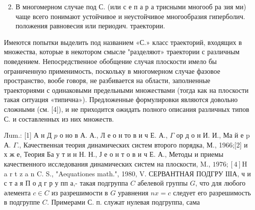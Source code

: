 \documentclass[10pt]{article}
\begin{document}
\begin{enumerate}

  \setcounter{enumi}{1}

  \item В многомерном случае под С. (или с е п а р а трисными многооб ра зия ми) чаще всего понимают устойчивое и неустойчивое многообразия гиперболич. положения равновесия или периодич. траектории.

\end{enumerate}



Имеются попытки выделить под названием «С.» класс траекторий, входящих в множества, которые в некотором смысле "разделяют» траектории с различным поведением. Непосредственное обобщение случая плоскости имело бы ограниченную применимость, поскольку в многомерном случае фазовое пространство, вообе говоря, не разбивается на области, заполненные траекториями с одинаковыми предельными множествами (тогда как на плоскости такая ситуация «типична»). Предложенные формулировки являются довольно сложными (см. [4]), и не приходится ожидать полного описания различных типов С. и составленных из них множеств.



Лum.: [1] А н Д $p$ о но в А. А., Л е о н то в и ч Е. А., $\Gamma$ ор д о н И. И., Ма й е $\mathrm{p}$ А. $\Gamma$., Качественная теория динамических систем второго порядка, М., 1966;[2] и х ж е, Теория Ба у т и н Н. Н., Ј е о н т о в и ч Е. А., Методы и приемы качественного исследования динамических систем на плоскости, M., $1976 ;[4] \mathrm{H}$ a r t $\mathrm{z}$ a n C. S., "Aequationes math.", 1980, V. СЕРВАНТНАЯ ПОДГРУ ІІІА, ч и с т а я П о д г р у пп а,- такая подгруппа $C$ абелевой группы $G$, что для любого әлемента $c \in C$ из разрешимости в $G$ уравнения $n x=c$ следует его разрешимость в подгруппе $C$. Примерами С. п. служат нулевая подгруппа, сама
\end{document}
